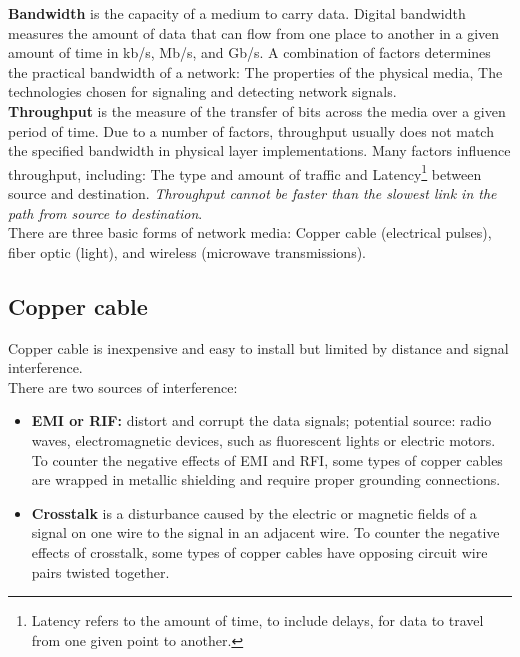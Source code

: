 \textbf{Bandwidth} is the capacity of a medium to carry data. Digital bandwidth measures the amount of data that can flow from one place to another in a given amount of time in kb/s, Mb/s, and Gb/s. A combination of factors determines the practical bandwidth of a network: The properties of the physical media, The technologies chosen for signaling and detecting network signals.\\

\textbf{Throughput} is the measure of the transfer of bits across the media over a given period of time. Due to a number of factors, throughput usually does not match the specified bandwidth in physical layer implementations. Many factors influence throughput, including: The type and amount of traffic and Latency\footnote{Latency refers to the amount of time, to include delays, for data to travel from one given point to another.} between source and destination. \emph{Throughput cannot be faster than the slowest link in the path from source to destination}. \\

There are three basic forms of network media: Copper cable (electrical pulses), fiber optic (light), and wireless (microwave transmissions).\\

\subsection{Copper cable}

Copper cable is inexpensive and easy to install but limited by distance and signal interference. \\

There are two sources of interference:

\begin{itemize}
\item \textbf{EMI or RIF:} distort and corrupt the data signals; potential source: radio waves, electromagnetic devices, such as fluorescent lights or electric motors. To counter the negative effects of EMI and RFI, some types of copper cables are wrapped in metallic shielding and require proper grounding connections.

\item \textbf{Crosstalk} is a disturbance caused by the electric or magnetic fields of a signal on one wire to the signal in an adjacent wire. To counter the negative effects of crosstalk, some types of copper cables have opposing circuit wire pairs twisted together. 
\end{itemize}

